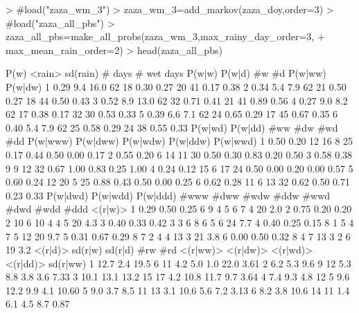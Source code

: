 \documentclass{article}
\begin{document}
\begin{Schunk}
\begin{Sinput}
> #load("zaza_wm_3")
> zaza_wm_3=add_markov(zaza_doy,order=3)
> #load("zaza_all_pbs")
> zaza_all_pbs=make_all_probs(zaza_wm_3,max_rainy_day_order=3,
+                             max_mean_rain_order=2)
> head(zaza_all_pbs)
\end{Sinput}
\begin{Soutput}
  P(w) <rain> sd(rain) # days # wet days P(w|w) P(w|d) #w #d P(w|ww) P(w|dw)
1 0.29    9.4     16.0     62         18   0.30   0.27 20 41    0.17    0.38
2 0.34    5.4      7.9     62         21   0.50   0.27 18 44    0.50    0.43
3 0.52    8.9     13.0     62         32   0.71   0.41 21 41    0.89    0.56
4 0.27    9.0      8.2     62         17   0.38   0.17 32 30    0.53    0.33
5 0.39    6.6      7.1     62         24   0.65   0.29 17 45    0.67    0.35
6 0.40    5.4      7.9     62         25   0.58   0.29 24 38    0.55    0.33
  P(w|wd) P(w|dd) #ww #dw #wd #dd P(w|www) P(w|dww) P(w|wdw) P(w|ddw) P(w|wwd)
1    0.50    0.20  12  16   8  25     0.17     0.44     0.50     0.00     0.17
2    0.55    0.20   6  14  11  30     0.50     0.30     0.83     0.20     0.50
3    0.58    0.38   9   9  12  32     0.67     1.00     0.83     0.25     1.00
4    0.24    0.12  15   6  17  24     0.50     0.00     0.20     0.00     0.57
5    0.60    0.24  12  20   5  25     0.88     0.43     0.50     0.00     0.25
6    0.62    0.28  11   6  13  32     0.62     0.50     0.71     0.23     0.33
  P(w|dwd) P(w|wdd) P(w|ddd) #www #dww #wdw #ddw #wwd #dwd #wdd #ddd <(r|w)>
1     0.29     0.50     0.25    6    9    4    5    6    7    4   20     2.0
2     0.75     0.20     0.20    2   10    6   10    4    4    5   20     4.3
3     0.40     0.33     0.42    3    3    6    8    6    5    6   24     7.7
4     0.40     0.25     0.15    8    1    5    4    7    5   12   20     9.7
5     0.31     0.67     0.29    8    7    2    4    4   13    3   21     3.8
6     0.00     0.50     0.32    8    4    7   13    3    2    6   19     3.2
  <(r|d)> sd(r|w) sd(r|d) #rw #rd <(r|ww)> <(r|dw)> <(r|wd)> <(r|dd)> sd(r|ww)
1    12.7     2.4    19.5   6  11      4.2      5.0      1.0     22.0     3.61
2     6.2     5.3     9.6   9  12      5.3      8.8      3.8      3.6     7.33
3    10.1    13.1    13.2  15  17      4.2     10.8     11.7      9.7     3.64
4     7.4     9.3     4.8  12   5      9.6     12.2      9.9      4.1    10.60
5     9.0     3.7     8.5  11  13      3.1     10.6      5.6      7.2     3.13
6     8.2     3.8    10.6  14  11      1.4      6.1      4.5      8.7     0.87

\end{Soutput}
\end{Schunk}
\end{document}
